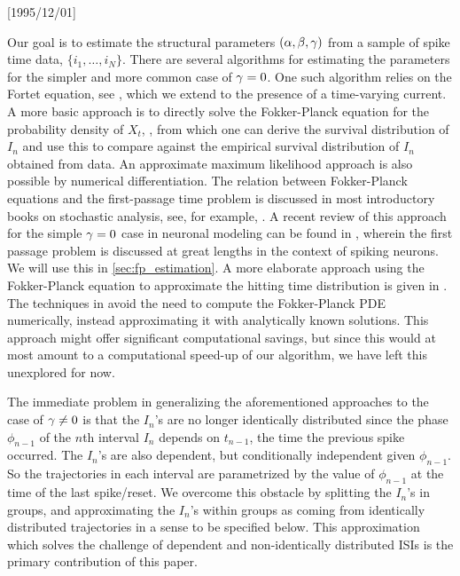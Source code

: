 \NeedsTeXFormat{LaTeX2e}[1995/12/01] \documentclass[10pt]{bmc_article}
\newenvironment{bmcformat}{\begin{raggedright}\baselineskip20pt\sloppy\setboolean{publ}{false}}{\end{raggedright}\baselineskip20pt\sloppy}
\begin{document}
\begin{bmcformat}
Our goal is to estimate the structural parameters $({{\alpha},{\beta},{\gamma } })$ from a sample of
spike time data, $\{i_1,\ldots,i_N\}$. There are several algorithms for
estimating the parameters for the simpler and more common case of ${\gamma } = 0$. One
such algorithm relies on the Fortet equation, see
\cite{Ditlevsen2008,Ditlevsen2007}, which we extend to the presence of a
time-varying current. A more basic approach is to directly solve the
Fokker-Planck equation for the probability density of $X_t$,
\cite{Sirovich2011a,Paninski2004,Dong2011}, from which one can derive the
survival distribution of $I_n$ and use this to compare against the empirical
survival distribution of $I_n$ obtained from data. An approximate maximum
likelihood approach is also possible by numerical differentiation. The relation
between Fokker-Planck equations and the first-passage time problem is discussed
in most introductory books on stochastic analysis, see, for example,
\cite{Jacobs}. A recent review of this approach for the simple ${\gamma }=0$ case in
neuronal modeling can be found in \cite{Sirovich2011a}, wherein the first
passage problem is discussed at great lengths in the context of spiking neurons.
We will use this in \cref{sec:fp_estimation}. A more elaborate approach using
the Fokker-Planck equation to approximate the hitting time distribution is given
in \cite{Lo2006}. The techniques in \cite{Lo2006} avoid the need to compute the
Fokker-Planck PDE numerically, instead approximating it with analytically known
solutions. This approach might offer significant computational savings, but
since this would at most amount to a computational speed-up of our algorithm, we
have left this unexplored for now.


The immediate problem in generalizing the aforementioned approaches to the case
of ${\gamma } \neq 0$ is that the $I_n$'s are no longer identically distributed since
the phase $\phi_{n-1}$ of the $n$th interval $I_n$ depends on $t_{n-1}$, the
time the previous spike occurred. The $I_n$'s are also dependent, but conditionally
independent given $\phi_{n-1}$. So the trajectories in each interval are
parametrized by the value of $\phi_{n-1}$ at the time of the last spike/reset.
We overcome this obstacle by splitting the $I_n$'s in groups, and
approximating the $I_n$'s within groups as coming from identically
distributed trajectories in a sense to be specified below. This approximation
which solves the challenge of dependent and non-identically distributed ISIs is
the primary contribution of this paper.


\end{bmcformat}
\end{document}
